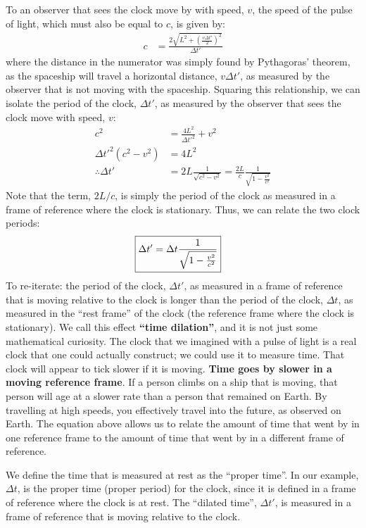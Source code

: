 To an observer that sees the clock move by with speed, $v$, the speed of the pulse of light, which must also be equal to $c$, is given by:
\begin{align*}
c&=\frac{2\sqrt{L^2+\left(\frac{v\Delta t'}{2}\right)^2}}{\Delta t'}
\end{align*}
where the distance in the numerator was simply found by Pythagoras' theorem, as the spaceship will travel a horizontal distance, $v\Delta t'$, as measured by the observer that is not moving with the spaceship. Squaring this relationship, we can isolate the period of the clock, $\Delta t'$, as measured by the observer that sees the clock move with speed, $v$:
\begin{align*}
c^2&=\frac{4L^2}{\Delta t'^2}+v^2\\
\Delta t'^2 (c^2-v^2)&=4L^2\\
\therefore \Delta t' &= 2L\frac{1}{\sqrt{c^2-v^2}}=\frac{2L}{c}\frac{1}{\sqrt{1-\frac{v^2}{c^2}}}
\end{align*}
Note that the term, $2L/c$, is simply the period of the clock as measured in a frame of reference where the clock is stationary. Thus, we can relate the two clock periods:
\begin{align*}
\Aboxed{\Delta t' &= \Delta t \frac{1}{\sqrt{1-\frac{v^2}{c^2}}}}
\end{align*}
To re-iterate: the period of the clock, $\Delta t'$, as measured in a frame of reference that is moving relative to the clock is longer than the period of the clock, $\Delta t$, as measured in the ``rest frame'' of the clock (the reference frame where the clock is stationary). We call this effect \textbf{``time dilation''}, and it is not just some mathematical curiosity. The clock that we imagined with a pulse of light is a real clock that one could actually construct; we could use it to measure time. That clock will appear to tick slower if it is moving. \textbf{Time goes by slower in a moving reference frame}. If a person climbs on a ship that is moving, that person will age at a slower rate than a person that remained on Earth. By travelling at high speeds, you effectively travel into the future, as observed on Earth. The equation above allows us to relate the amount of time that went by in one reference frame to the amount of time that went by in a different frame of reference.

We define the time that is measured at rest as the ``proper time''. In our example, $\Delta t$, is the proper time (proper period) for the clock, since it is defined in a frame of reference where the clock is at rest. The ``dilated time'', $\Delta t'$, is measured in a frame of reference that is moving relative to the clock.

